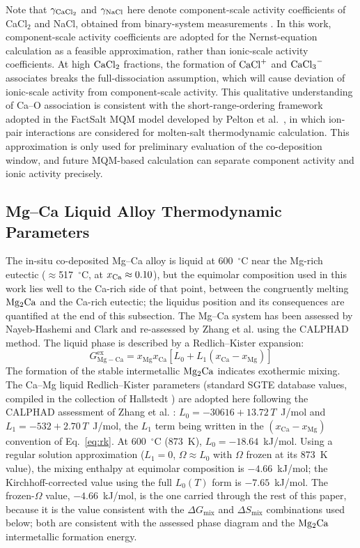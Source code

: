 \documentclass[pdflatex,sn-basic,Numbered]{sn-jnl}
\begin{document}
Note that $\gamma_{\ce{CaCl2}}$ and $\gamma_{\ce{NaCl}}$ here denote component-scale activity coefficients of CaCl$_2$ and NaCl, obtained from binary-system measurements \cite{chartrand2000,kleppa1966}. In this work, component-scale activity coefficients are adopted for the Nernst-equation calculation as a feasible approximation, rather than ionic-scale activity coefficients. At high $\ce{CaCl2}$ fractions, the formation of $\ce{CaCl+}$ and $\ce{CaCl3-}$ associates breaks the full-dissociation assumption, which will cause deviation of ionic-scale activity from component-scale activity. This qualitative understanding of Ca--O association is consistent with the short-range-ordering framework adopted in the FactSalt MQM model developed by Pelton et al.\ \cite{pelton2000mqm}, in which ion-pair interactions are considered for molten-salt thermodynamic calculation. This approximation is only used for preliminary evaluation of the co-deposition window, and future MQM-based calculation can separate component activity and ionic activity precisely.

\subsection{Mg--Ca Liquid Alloy Thermodynamic Parameters}
\label{subsec:MgCa}

The in-situ co-deposited Mg--Ca alloy is liquid at 600~$^{\circ}$C near the Mg-rich eutectic ($\approx$517~$^{\circ}$C, at $x_{\ce{Ca}} \approx 0.10$), but the equimolar composition used in this work lies well to the Ca-rich side of that point, between the congruently melting $\ce{Mg2Ca}$ and the Ca-rich eutectic; the liquidus position and its consequences are quantified at the end of this subsection. The Mg--Ca system has been assessed by Nayeb-Hashemi and Clark \cite{nayeb1987} and re-assessed by Zhang et al. \cite{zhang2008mgce} using the CALPHAD method. The liquid phase is described by a Redlich--Kister expansion:
\begin{equation}
\label{eq:rk}
G^{\mathrm{ex}}_{\mathrm{Mg-Ca}} = x_{\mathrm{Mg}}x_{\mathrm{Ca}}\left[L_0 + L_1(x_{\mathrm{Ca}}-x_{\mathrm{Mg}})\right]
\end{equation}
The formation of the stable intermetallic $\ce{Mg2Ca}$ indicates exothermic mixing. The Ca--Mg liquid Redlich--Kister parameters (standard SGTE database values, compiled in the collection of Hallstedt \cite{hallstedt2025}) are adopted here following the CALPHAD assessment of Zhang et al. \cite{zhang2008mgce}: $L_0 = -30616 + 13.72\,T$~J/mol and $L_1 = -532 + 2.70\,T$~J/mol, the $L_1$ term being written in the $(x_{\mathrm{Ca}}-x_{\mathrm{Mg}})$ convention of Eq.~\ref{eq:rk}. At 600~$^{\circ}$C (873~K), $L_0 = -18.64$~kJ/mol. Using a regular solution approximation ($L_1 = 0$, $\Omega \approx L_0$ with $\Omega$ frozen at its 873~K value), the mixing enthalpy at equimolar composition is $-4.66$~kJ/mol; the Kirchhoff-corrected value using the full $L_0(T)$ form is $-7.65$~kJ/mol. The frozen-$\Omega$ value, $-4.66$~kJ/mol, is the one carried through the rest of this paper, because it is the value consistent with the $\Delta G_{\mathrm{mix}}$ and $\Delta S_{\mathrm{mix}}$ combinations used below; both are consistent with the assessed phase diagram and the $\ce{Mg2Ca}$ intermetallic formation energy.
\end{document}
